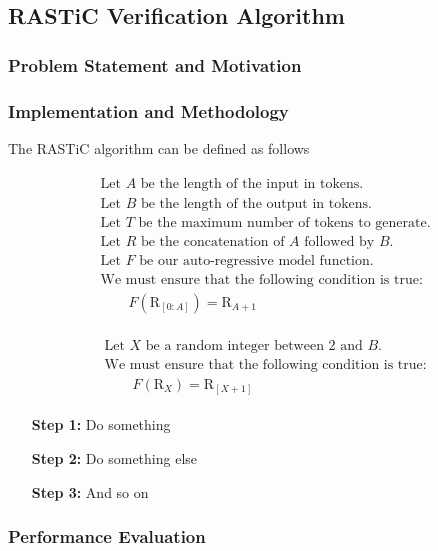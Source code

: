 \documentclass{article}
\begin{document}
\subsection{RASTiC Verification Algorithm}
\subsubsection{Problem Statement and Motivation}
\subsubsection{Implementation and Methodology}
The RASTiC algorithm can be defined as follows

\begin{align*}
    \begin{aligned}
    &\text{Let }A\text{ be the length of the input in tokens.}\\
    &\text{Let }B\text{ be the length of the output in tokens.}\\
    &\text{Let }T\text{ be the maximum number of tokens to generate.}\\
    &\text{Let }R\text{ be the concatenation of }A\text{ followed by }B.\\
    &\text{Let }F\text{ be our auto-regressive model function.}\\
    &\text{We must ensure that the following condition is true:}\\
    &\qquad F(\text{R}_{[0:A]}) = \text{R}_{A+1}
    \end{aligned}
\end{align*}

\begin{align*}
    \begin{aligned}
    &\text{Let } X \text{ be a random integer between 2 and } B. \\
    &\text{We must ensure that the following condition is true:} \\
    &\qquad F(\text{R}_X) = \text{R}_{[X+1]}
\end{aligned}
\end{align*}

\begin{enumerate}
\item[\textbf{Step 1:}] Do something
\item[\textbf{Step 2:}] Do something else
\item[\textbf{Step 3:}] And so on
\end{enumerate}
\subsubsection{Performance Evaluation}
\end{document}
